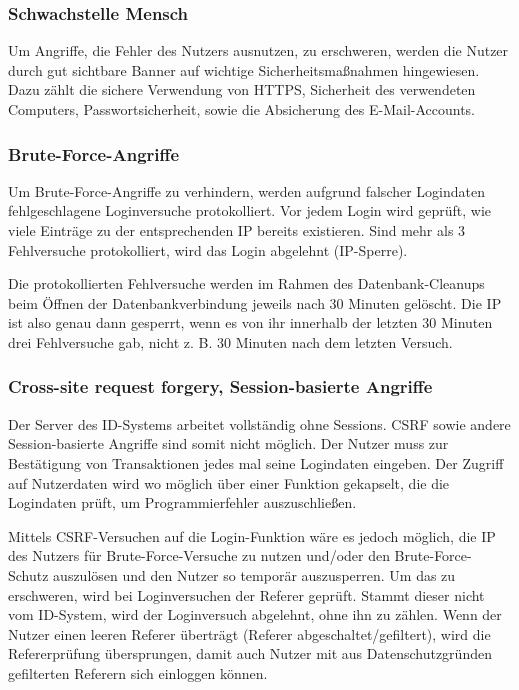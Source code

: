 \subsubsection{Schwachstelle Mensch}
Um Angriffe, die Fehler des Nutzers ausnutzen, zu erschweren, werden die Nutzer durch gut sichtbare Banner auf wichtige Sicherheitsmaßnahmen hingewiesen.
Dazu zählt die sichere Verwendung von HTTPS, Sicherheit des verwendeten Computers, Passwortsicherheit, sowie die Absicherung des E-Mail-Accounts.

\subsubsection{Brute-Force-Angriffe}
Um Brute-Force-Angriffe zu verhindern, werden aufgrund falscher Logindaten fehlgeschlagene Loginversuche protokolliert.
Vor jedem Login wird geprüft, wie viele Einträge zu der entsprechenden IP bereits existieren.
Sind mehr als 3 Fehlversuche protokolliert, wird das Login abgelehnt (IP-Sperre).

Die protokollierten Fehlversuche werden im Rahmen des Datenbank-Cleanups beim Öffnen der Datenbankverbindung jeweils nach 30 Minuten gelöscht.
Die IP ist also genau dann gesperrt, wenn es von ihr innerhalb der letzten 30 Minuten drei Fehlversuche gab,
nicht z. B. 30 Minuten nach dem letzten Versuch.

\subsubsection{Cross-site request forgery, Session-basierte Angriffe}
Der Server des ID-Systems arbeitet vollständig ohne Sessions. CSRF sowie andere Session-basierte Angriffe sind somit nicht möglich.
Der Nutzer muss zur Bestätigung von Transaktionen jedes mal seine Logindaten eingeben.
Der Zugriff auf Nutzerdaten wird wo möglich über einer Funktion gekapselt, die die Logindaten prüft, um Programmierfehler auszuschließen.

Mittels CSRF-Versuchen auf die Login-Funktion wäre es jedoch möglich, die IP des Nutzers für Brute-Force-Versuche zu nutzen
und/oder den Brute-Force-Schutz auszulösen und den Nutzer so temporär auszusperren.
Um das zu erschweren, wird bei Loginversuchen der Referer geprüft.
Stammt dieser nicht vom ID-System, wird der Loginversuch abgelehnt, ohne ihn zu zählen.
Wenn der Nutzer einen leeren Referer überträgt (Referer abgeschaltet/gefiltert), wird die Refererprüfung übersprungen,
damit auch Nutzer mit aus Datenschutzgründen gefilterten Referern sich einloggen können.

